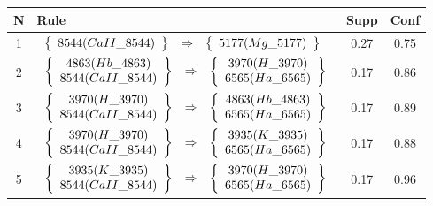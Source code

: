 \begin{longtable}{| c | l | c | c |}
\hline
\textbf{N} & \textbf{Rule} & \textbf{Supp} & \textbf{Conf} \\ \hline
1 & $\begin{array}{c c c}\left\{\begin{array}{c}8544 (CaII\_8544)\end{array}\right\} & \Rightarrow & \left\{\begin{array}{c}5177 (Mg\_5177)\end{array}\right\}\end{array}$ & 0.27 & 0.75 \\ \hline
2 & $\begin{array}{c c c}\left\{\begin{array}{c}4863 (Hb\_4863) \\ 8544 (CaII\_8544)\end{array}\right\} & \Rightarrow & \left\{\begin{array}{c}3970 (H\_3970) \\ 6565 (Ha\_6565)\end{array}\right\}\end{array}$ & 0.17 & 0.86 \\ \hline
3 & $\begin{array}{c c c}\left\{\begin{array}{c}3970 (H\_3970) \\ 8544 (CaII\_8544)\end{array}\right\} & \Rightarrow & \left\{\begin{array}{c}4863 (Hb\_4863) \\ 6565 (Ha\_6565)\end{array}\right\}\end{array}$ & 0.17 & 0.89 \\ \hline
4 & $\begin{array}{c c c}\left\{\begin{array}{c}3970 (H\_3970) \\ 8544 (CaII\_8544)\end{array}\right\} & \Rightarrow & \left\{\begin{array}{c}3935 (K\_3935) \\ 6565 (Ha\_6565)\end{array}\right\}\end{array}$ & 0.17 & 0.88 \\ \hline
5 & $\begin{array}{c c c}\left\{\begin{array}{c}3935 (K\_3935) \\ 8544 (CaII\_8544)\end{array}\right\} & \Rightarrow & \left\{\begin{array}{c}3970 (H\_3970) \\ 6565 (Ha\_6565)\end{array}\right\}\end{array}$ & 0.17 & 0.96 \\ \hline
\end{longtable}

